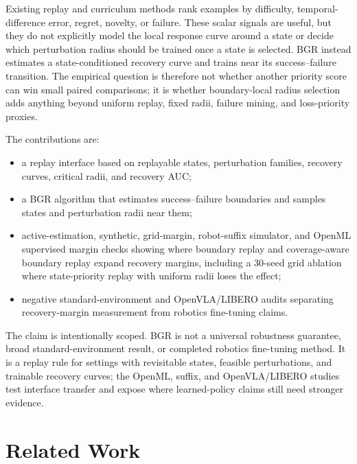 \documentclass[letterpaper]{article}
\begin{document}
Existing replay and curriculum methods rank examples by difficulty, temporal-difference error, regret, novelty, or failure. These scalar signals are useful, but they do not explicitly model the local response curve around a state or decide which perturbation radius should be trained once a state is selected. BGR instead estimates a state-conditioned recovery curve and trains near its success--failure transition. The empirical question is therefore not whether another priority score can win small paired comparisons; it is whether boundary-local radius selection adds anything beyond uniform replay, fixed radii, failure mining, and loss-priority proxies.

The contributions are:
\begin{itemize}
    \item a replay interface based on replayable states, perturbation families, recovery curves, critical radii, and recovery AUC;
    \item a BGR algorithm that estimates success--failure boundaries and samples states and perturbation radii near them;
    \item active-estimation, synthetic, grid-margin, robot-suffix simulator, and OpenML supervised margin checks showing where boundary replay and coverage-aware boundary replay expand recovery margins, including a 30-seed grid ablation where state-priority replay with uniform radii loses the effect;
    \item negative standard-environment and OpenVLA/LIBERO audits separating recovery-margin measurement from robotics fine-tuning claims.
\end{itemize}

The claim is intentionally scoped. BGR is not a universal robustness guarantee, broad standard-environment result, or completed robotics fine-tuning method. It is a replay rule for settings with revisitable states, feasible perturbations, and trainable recovery curves; the OpenML, suffix, and OpenVLA/LIBERO studies test interface transfer and expose where learned-policy claims still need stronger evidence.

\section{Related Work}
\end{document}

